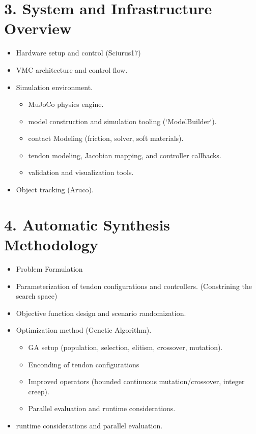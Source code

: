 \documentclass[12pt,a4paper]{article}
\begin{document}
\section*{3. System and Infrastructure Overview}
\begin{itemize}
  \item Hardware setup and control (Sciurus17)
  \item VMC architecture and control flow.
  \item Simulation environment.
    \begin{itemize}
        \item MuJoCo physics engine.
        \item model construction and simulation tooling (`ModelBuilder`).
        \item contact Modeling (friction, solver, soft materials).
        \item tendon modeling, Jacobian mapping, and controller callbacks.
        \item validation and visualization tools.
    \end{itemize}
  \item Object tracking (Aruco). 
  
\end{itemize}

\section*{4. Automatic Synthesis Methodology}
\begin{itemize}
    \item Problem Formulation
    \item Parameterization of tendon configurations and controllers. (Constrining the search space)
    \item Objective function design and scenario randomization.
    \item Optimization method (Genetic Algorithm).
    \begin{itemize}
        \item GA setup (population, selection, elitism, crossover, mutation).
        \item Enconding of tendon configurations
        \item Improved operators (bounded continuous mutation/crossover, integer creep).
        \item Parallel evaluation and runtime considerations.
    \end{itemize}
    \item runtime considerations and parallel evaluation.
\end{itemize}
\end{document}
